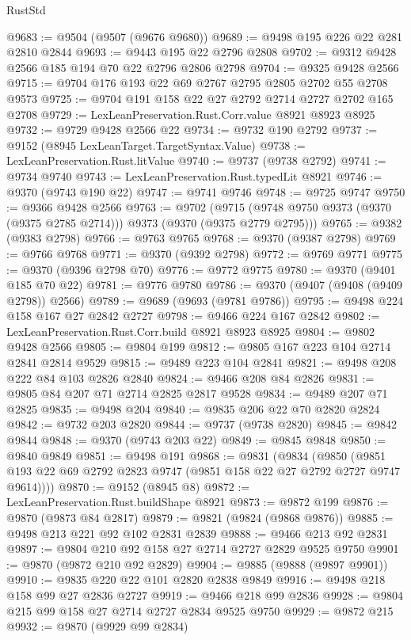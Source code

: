 \begin{lexlean}{RustStd}
\begin{coremodule}
@9683 := @9504 (@9507 (@9676 @9680))
@9689 := @9498 @195 @226 @22 @281 @2810 @2844
@9693 := @9443 @195 @22 @2796 @2808
@9702 := @9312 @9428 @2566 @185 @194 @70 @22 @2796 @2806 @2798
@9704 := @9325 @9428 @2566
@9715 := @9704 @176 @193 @22 @69 @2767 @2795 @2805 @2702 @55 @2708 @9573
@9725 := @9704 @191 @158 @22 @27 @2792 @2714 @2727 @2702 @165 @2708
@9729 := LexLeanPreservation.Rust.Corr.value @8921 @8923 @8925
@9732 := @9729 @9428 @2566 @22
@9734 := @9732 @190 @2792
@9737 := @9152 (@8945 LexLeanTarget.TargetSyntax.Value)
@9738 := LexLeanPreservation.Rust.litValue
@9740 := @9737 (@9738 @2792)
@9741 := @9734 @9740
@9743 := LexLeanPreservation.Rust.typedLit @8921
@9746 := @9370 (@9743 @190 @22)
@9747 := @9741 @9746
@9748 := @9725 @9747
@9750 := @9366 @9428 @2566
@9763 := @9702
    (@9715 (@9748 @9750 @9373 (@9370 (@9375 @2785 @2714))) @9373 (@9370 (@9375 @2779 @2795)))
@9765 := @9382 (@9383 @2798)
@9766 := @9763 @9765
@9768 := @9370 (@9387 @2798)
@9769 := @9766 @9768
@9771 := @9370 (@9392 @2798)
@9772 := @9769 @9771
@9775 := @9370 (@9396 @2798 @70)
@9776 := @9772 @9775
@9780 := @9370 (@9401 @185 @70 @22)
@9781 := @9776 @9780
@9786 := @9370 (@9407 (@9408 (@9409 @2798)) @2566)
@9789 := @9689 (@9693 (@9781 @9786))
@9795 := @9498 @224 @158 @167 @27 @2842 @2727
@9798 := @9466 @224 @167 @2842
@9802 := LexLeanPreservation.Rust.Corr.build @8921 @8923 @8925
@9804 := @9802 @9428 @2566
@9805 := @9804 @199
@9812 := @9805 @167 @223 @104 @2714 @2841 @2814 @9529
@9815 := @9489 @223 @104 @2841
@9821 := @9498 @208 @222 @84 @103 @2826 @2840
@9824 := @9466 @208 @84 @2826
@9831 := @9805 @84 @207 @71 @2714 @2825 @2817 @9528
@9834 := @9489 @207 @71 @2825
@9835 := @9498 @204
@9840 := @9835 @206 @22 @70 @2820 @2824
@9842 := @9732 @203 @2820
@9844 := @9737 (@9738 @2820)
@9845 := @9842 @9844
@9848 := @9370 (@9743 @203 @22)
@9849 := @9845 @9848
@9850 := @9840 @9849
@9851 := @9498 @191
@9868 := @9831
    (@9834
      (@9850 (@9851 @193 @22 @69 @2792 @2823 @9747 (@9851 @158 @22 @27 @2792 @2727 @9747 @9614))))
@9870 := @9152 (@8945 @8)
@9872 := LexLeanPreservation.Rust.buildShape @8921
@9873 := @9872 @199
@9876 := @9870 (@9873 @84 @2817)
@9879 := @9821 (@9824 (@9868 @9876))
@9885 := @9498 @213 @221 @92 @102 @2831 @2839
@9888 := @9466 @213 @92 @2831
@9897 := @9804 @210 @92 @158 @27 @2714 @2727 @2829 @9525 @9750
@9901 := @9870 (@9872 @210 @92 @2829)
@9904 := @9885 (@9888 (@9897 @9901))
@9910 := @9835 @220 @22 @101 @2820 @2838 @9849
@9916 := @9498 @218 @158 @99 @27 @2836 @2727
@9919 := @9466 @218 @99 @2836
@9928 := @9804 @215 @99 @158 @27 @2714 @2727 @2834 @9525 @9750
@9929 := @9872 @215
@9932 := @9870 (@9929 @99 @2834)

\end{coremodule}
\end{lexlean}
